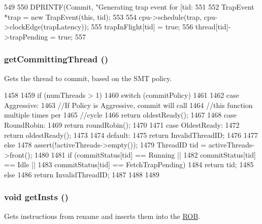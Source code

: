 \begin{DoxyCode}
549 {
550     DPRINTF(Commit, "Generating trap event for [tid:%
551 
552     TrapEvent *trap = new TrapEvent(this, tid);
553 
554     cpu->schedule(trap, cpu->clockEdge(trapLatency));
555     trapInFlight[tid] = true;
556     thread[tid]->trapPending = true;
557 }
\end{DoxyCode}
\hypertarget{classDefaultCommit_ad313fd14604cfa26fec9c62dba3a7062}{
\subsubsection[{getCommittingThread}]{ getCommittingThread ()}}
\label{classDefaultCommit_ad313fd14604cfa26fec9c62dba3a7062}
Gets the thread to commit, based on the SMT policy. 


\begin{DoxyCode}
1458 {
1459     if (numThreads > 1) {
1460         switch (commitPolicy) {
1461 
1462           case Aggressive:
1463             //If Policy is Aggressive, commit will call
1464             //this function multiple times per
1465             //cycle
1466             return oldestReady();
1467 
1468           case RoundRobin:
1469             return roundRobin();
1470 
1471           case OldestReady:
1472             return oldestReady();
1473 
1474           default:
1475             return InvalidThreadID;
1476         }
1477     } else {
1478         assert(!activeThreads->empty());
1479         ThreadID tid = activeThreads->front();
1480 
1481         if (commitStatus[tid] == Running ||
1482             commitStatus[tid] == Idle ||
1483             commitStatus[tid] == FetchTrapPending) {
1484             return tid;
1485         } else {
1486             return InvalidThreadID;
1487         }
1488     }
1489 }
\end{DoxyCode}
\hypertarget{classDefaultCommit_a8d0c39182cb7719942e865bcaaff769b}{
\subsubsection[{getInsts}]{\setlength{\rightskip}{0pt plus 5cm}void getInsts ()}}
\label{classDefaultCommit_a8d0c39182cb7719942e865bcaaff769b}
Gets instructions from rename and inserts them into the \hyperlink{classROB}{ROB}. 


